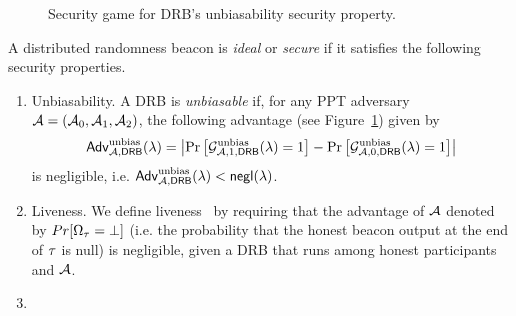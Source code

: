 \begin{figure}[h]
\begin{center}
\end{center}
\caption{Security game for DRB's unbiasability security property.}
\label{figure:unbias}
\end{figure}

\begin{definition}
A distributed randomness beacon is \textit{ideal} or \textit{secure} if it satisfies the following security properties.
\begin{enumerate}
\item Unbiasability.
A DRB is \textit{unbiasable} if, for any PPT adversary $\mathcal{A} = (\mathcal{A}_0, \mathcal{A}_1, \mathcal{A}_2)$, the following advantage (see Figure~\ref{figure:unbias}) given by
\begingroup\makeatletter\def\f@size{8}\check@mathfonts
\begin{equation*}
\mathsf{Adv}^\text{unbias}_{\mathcal{A}, \mathsf{DRB}}(\lambda) = \left|\Pr\left[\mathcal{G}^\text{unbias}_{\mathcal{A}, 1, \mathsf{DRB}}(\lambda) = 1\right] - \Pr\left[\mathcal{G}^\text{unbias}_{\mathcal{A}, 0, \mathsf{DRB}}(\lambda) = 1\right]\right|
\end{equation*}\endgroup
is negligible, i.e. $\mathsf{Adv}^\text{unbias}_{\mathcal{A}, \mathsf{DRB}}(\lambda) < \mathsf{negl}(\lambda)$.

\item Liveness. We define liveness~\cite{guo2020secRand} by requiring that the advantage of $\mathcal{A}$ denoted by $Pr[\Omega_\tau = \text{$\perp$}]$ (i.e. the probability that the honest beacon output at the end of \epoch $\tau$ is null) is negligible, given a DRB that runs among honest participants and $\mathcal{A}$.

\item {}
\end{enumerate}
\end{definition}


